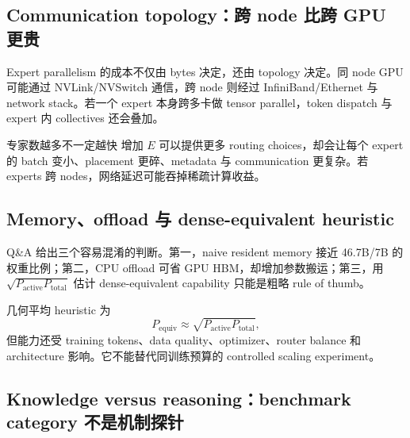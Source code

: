 \documentclass[a4paper]{article}
\begin{document}

\subsection{Communication topology：跨 node 比跨 GPU 更贵}

Expert parallelism 的成本不仅由 bytes 决定，还由 topology 决定。同 node GPU 可能通过 NVLink/NVSwitch 通信，跨 node 则经过 InfiniBand/Ethernet 与 network stack。若一个 expert 本身跨多卡做 tensor parallel，token dispatch 与 expert 内 collectives 还会叠加。

\begin{warningbox}{专家数越多不一定越快}
增加 $E$ 可以提供更多 routing choices，却会让每个 expert 的 batch 变小、placement 更碎、metadata 与 communication 更复杂。若 experts 跨 nodes，网络延迟可能吞掉稀疏计算收益。
\end{warningbox}


\subsection{Memory、offload 与 dense-equivalent heuristic}

Q\&A 给出三个容易混淆的判断。第一，naive resident memory 接近 46.7B/7B 的权重比例；第二，CPU offload 可省 GPU HBM，却增加参数搬运；第三，用 $\sqrt{P_{\text{active}}P_{\text{total}}}$ 估计 dense-equivalent capability 只能是粗略 rule of thumb。

几何平均 heuristic 为
\[
P_{\text{equiv}}\approx \sqrt{P_{\text{active}}P_{\text{total}}},
\]
但能力还受 training tokens、data quality、optimizer、router balance 和 architecture 影响。它不能替代同训练预算的 controlled scaling experiment。


\subsection{Knowledge versus reasoning：benchmark category 不是机制探针}
\end{document}
